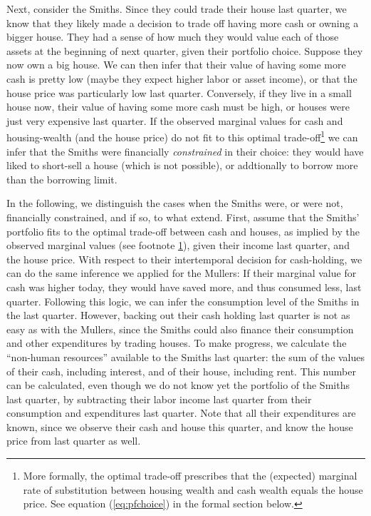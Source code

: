\documentclass[11pt]{article} %
\begin{document}
Next, consider the Smiths. Since they could trade their house last quarter, we know that they likely made a decision to trade off
having more cash or owning a bigger house. They had a sense of how much they would value each of those assets at the beginning of next quarter,
given their portfolio choice. Suppose they now own a big house. We can then infer that their value of having some more cash
is pretty low (maybe they expect higher labor or asset income), or that the house price was particularly low last quarter.
Conversely, if they live in a small house now, their value of having some more cash must be high, or houses were just very expensive
last quarter. If the observed marginal values for cash and housing-wealth (and the house price) do not fit to this optimal trade-off\footnote{More formally, the optimal trade-off prescribes that the (expected) marginal rate of substitution between housing wealth and cash wealth equals the house price. See equation (\ref{eq:pfchoice}) in the formal section below.\label{fn:tradeoff}}
we can infer that the Smiths were financially \textit{constrained} in their choice: they would have liked to short-sell a house (which is not possible), or addtionally to borrow more than the borrowing limit.

In the following, we distinguish the cases when the Smiths were, or were not, financially constrained, and if so, to what extend. First, assume that the Smiths' portfolio fits to the optimal trade-off between cash and houses, as implied by the observed marginal values (see footnote \ref{fn:tradeoff}),
given their income last quarter, and the house price. With respect to their intertemporal decision for cash-holding, we can do the same inference
we applied for the Mullers: If their marginal value for cash was higher today, they would have saved more, and thus consumed less, last quarter.
Following this logic, we can infer the consumption level of the Smiths in the last quarter. However, backing out their cash holding last
quarter is not as easy as with the Mullers, since the Smiths could also finance their consumption and other expenditures by trading houses.
To make progress, we calculate the ``non-human resources'' available to the Smiths last quarter: the sum of the values of their cash, including interest,
and of their house, including rent. This number can be calculated, even though we do not know yet the portfolio of the Smiths last quarter, by
subtracting their labor income last quarter from their consumption and expenditures last quarter. Note that all their expenditures are known, since
we observe their cash and house this quarter, and know the house price from last quarter as well.
\end{document}
